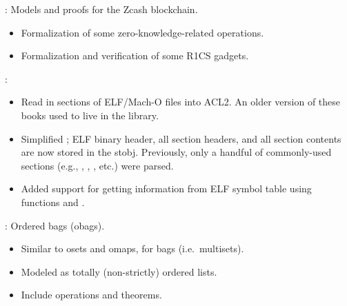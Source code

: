 
\begin{frame}

\newlibtitle

:
Models and proofs for the Zcash blockchain.
\begin{itemize}
\item Formalization of some zero-knowledge-related operations.
\item Formalization and verification of some R1CS gadgets.
\end{itemize}
\end{frame}


\begin{frame}

\newlibtitle

:

\begin{itemize}
\item Read in sections of ELF/Mach-O files into ACL2. An older version
      of these books used to live in the  library.
\item Simplified ; ELF binary header, all section
      headers, and all section contents are now stored in the 
      stobj. Previously, only a handful of commonly-used sections (e.g.,
      , , , etc.) were parsed.
\item Added support for getting information from ELF symbol table
      using functions  and
      .
\end{itemize}
\end{frame}


\begin{frame}

\newlibtitle

:
Ordered bags (obags).
\begin{itemize}
\item Similar to osets and omaps, for bags (i.e.\ multisets).
\item Modeled as totally (non-strictly) ordered lists.
\item Include operations and theorems.
\end{itemize}

\end{frame}

